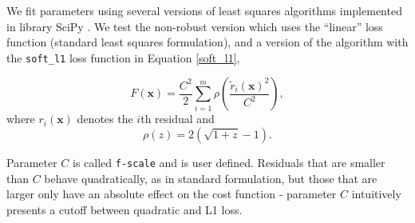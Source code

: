 \documentclass[
    11pt,
    a4paper,
    oneside
]{article}
\begin{document}
We fit parameters using several versions of least squares algorithms implemented in library SciPy \cite{2020SciPy-NMeth}. We test
the non-robust version which uses the ``linear'' loss function (standard least squares formulation),
and a version of the algorithm with the \texttt{soft\_l1} loss function in Equation \ref{soft_l1},

%



\begin{equation}\label{soft_l1}
    F(\boldsymbol{x})
    = \frac{C^2}{2}
      \sum_{i=1}^{m}
      \rho\left(\frac{\widetilde r_i(\boldsymbol{x})^2}{C^2}\right),
\end{equation}
where $r_i(\boldsymbol{x})$ denotes the $i$th residual and
\begin{equation}
    \rho(z) = 2\left(\sqrt{1+z}-1\right).
\end{equation}

Parameter $C$ is called \texttt{f-scale} and is user defined. Residuals that are smaller than $C$
behave quadratically, as in standard formulation, but those that are larger only have an absolute effect
on the cost function - parameter $C$ intuitively presents a cutoff between quadratic and L1 loss.
\end{document}
